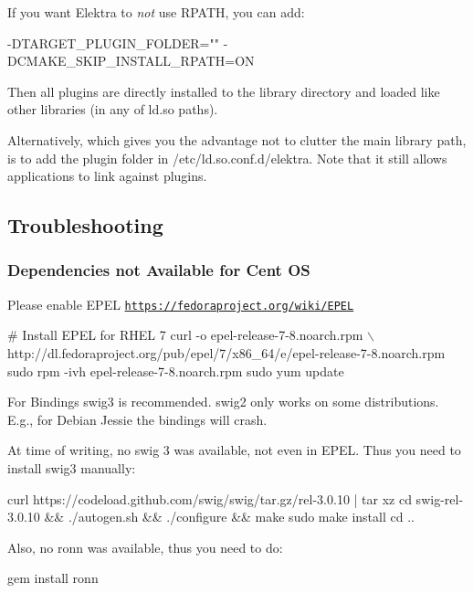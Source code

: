 If you want Elektra to {\itshape not} use {\ttfamily R\+P\+A\+TH}, you can add\+:


\begin{DoxyCode}
-DTARGET\_PLUGIN\_FOLDER="" -DCMAKE\_SKIP\_INSTALL\_RPATH=ON
\end{DoxyCode}


Then all plugins are directly installed to the library directory and loaded like other libraries (in any of {\ttfamily ld.\+so} paths).

Alternatively, which gives you the advantage not to clutter the main library path, is to add the plugin folder in {\ttfamily /etc/ld.so.\+conf.\+d/elektra}. Note that it still allows applications to link against plugins.

\subsection*{Troubleshooting}

\subsubsection*{Dependencies not Available for Cent OS}

Please enable E\+P\+EL \href{https://fedoraproject.org/wiki/EPEL}{\tt https\+://fedoraproject.\+org/wiki/\+E\+P\+EL}


\begin{DoxyCode}
# Install EPEL for RHEL 7
curl -o epel-release-7-8.noarch.rpm \(\backslash\)
  http://dl.fedoraproject.org/pub/epel/7/x86\_64/e/epel-release-7-8.noarch.rpm
sudo rpm -ivh epel-release-7-8.noarch.rpm
sudo yum update
\end{DoxyCode}


For Bindings swig3 is recommended. swig2 only works on some distributions. E.\+g., for Debian Jessie the bindings will crash.

At time of writing, no swig 3 was available, not even in E\+P\+EL. Thus you need to install swig3 manually\+:


\begin{DoxyCode}
curl https://codeload.github.com/swig/swig/tar.gz/rel-3.0.10 | tar xz
cd swig-rel-3.0.10 && ./autogen.sh && ./configure && make
sudo make install
cd ..
\end{DoxyCode}


Also, no ronn was available, thus you need to do\+:


\begin{DoxyCode}
gem install ronn
\end{DoxyCode}


